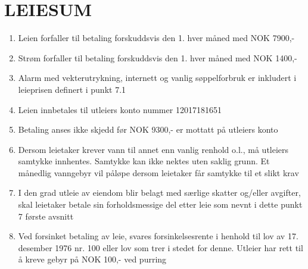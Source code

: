 \section{LEIESUM}


	\begin{enumerate}


        \item Leien forfaller til betaling forskuddsvis den 1. hver måned med NOK 7900,-


		\item Strøm forfaller til betaling forskuddsvis den 1. hver måned med NOK 1400,-

		\item Alarm med vekterutrykning, internett og vanlig søppelforbruk er inkludert i leieprisen definert i punkt 7.1 %

        \item Leien innbetales til utleiers konto nummer 12017181651

		\item Betaling anses ikke skjedd før NOK 9300,- er mottatt på utleiers konto


		\item Dersom leietaker krever vann til annet enn vanlig renhold o.l., må utleiers
        samtykke innhentes. Samtykke kan ikke nektes uten saklig grunn. Et månedlig vanngebyr vil påløpe dersom leietaker får samtykke til et slikt krav

		\item I den grad utleie av eiendom blir belagt med særlige skatter og/eller avgifter, skal leietaker betale sin
        forholdsmessige del etter leie som nevnt i dette punkt 7 første avsnitt

		\item Ved forsinket betaling av leie, svares forsinkelsesrente i henhold til lov av 17. desember 1976 nr. 100 eller lov som trer i stedet for denne. Utleier har rett til å kreve gebyr på NOK 100,- ved purring


	\end{enumerate}
